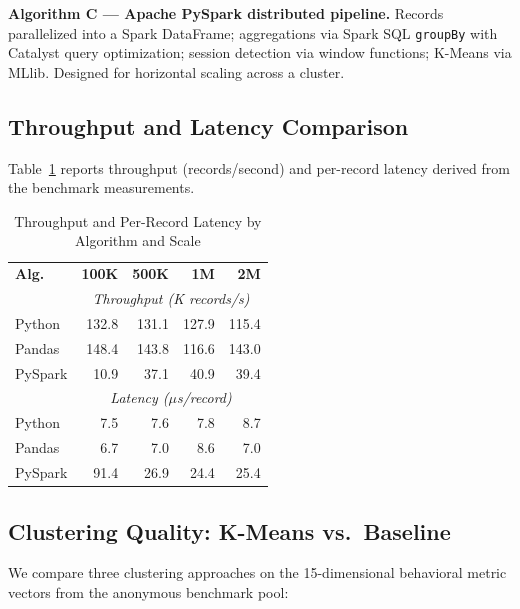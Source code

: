 \documentclass[conference]{IEEEtran}
\begin{document}
\textbf{Algorithm C — Apache PySpark distributed pipeline.}
Records parallelized into a Spark DataFrame; aggregations via Spark SQL
\texttt{groupBy} with Catalyst query optimization; session detection via
window functions; K-Means via MLlib. Designed for horizontal scaling
across a cluster.

\subsection{Throughput and Latency Comparison}

Table~\ref{tab:perf} reports throughput (records/second) and per-record
latency derived from the benchmark measurements.

\begin{table}[!t]
\caption{Throughput and Per-Record Latency by Algorithm and Scale}
\label{tab:perf}
\centering
\scriptsize
\setlength{\tabcolsep}{3pt}
\renewcommand{\arraystretch}{1.1}
\begin{tabular}{lrrrr}
\toprule
\textbf{Alg.} & \textbf{100K} & \textbf{500K} & \textbf{1M} & \textbf{2M} \\
              & \multicolumn{4}{c}{\textit{Throughput (K records/s)}} \\
\midrule
Python  & 132.8 & 131.1 & 127.9 & 115.4 \\
Pandas  & 148.4 & 143.8 & 116.6 & 143.0 \\
PySpark & 10.9  & 37.1  & 40.9  & 39.4  \\
\midrule
              & \multicolumn{4}{c}{\textit{Latency ($\mu$s/record)}} \\
\midrule
Python  & 7.5   & 7.6   & 7.8   & 8.7   \\
Pandas  & 6.7   & 7.0   & 8.6   & 7.0   \\
PySpark & 91.4  & 26.9  & 24.4  & 25.4  \\
\bottomrule
\end{tabular}
\end{table}

\subsection{Clustering Quality: K-Means vs.\ Baseline}

We compare three clustering approaches on the 15-dimensional behavioral
metric vectors from the anonymous benchmark pool:
\end{document}
